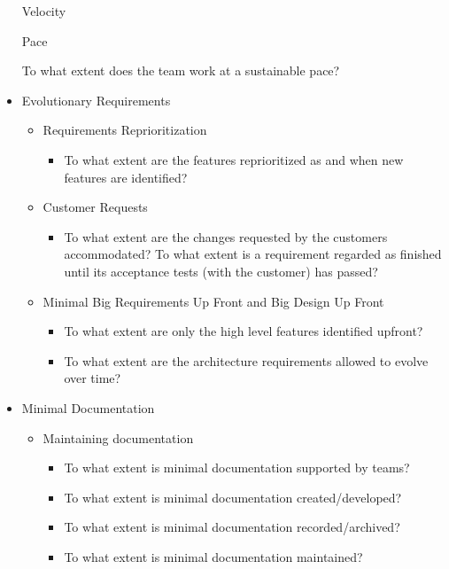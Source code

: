 \begin{appendices}
\begin{itemize}
	\addition Velocity
		\begin{itemize}
			\addition Pace
				\begin{itemize}
					\addition To what extent does the team work at a sustainable pace?
				\end{itemize}
		\end{itemize}
	\item Evolutionary Requirements
		\begin{itemize}
			\item Requirements Reprioritization 
				\begin{itemize}
					\item To what extent are the features reprioritized as and when new features are identified?
				\end{itemize}
			\item Customer Requests
				\begin{itemize}
					\item To what extent are the changes requested by the customers accommodated?
					\addition To what extent is a requirement regarded as finished until its acceptance tests (with the customer) has passed?
				\end{itemize}
			\item Minimal Big Requirements Up Front and Big Design Up Front
				\begin{itemize}
					\item To what extent are only the high level features identified upfront?
					\item To what extent are the architecture requirements allowed to evolve over time?
				\end{itemize}
		\end{itemize}
	\item Minimal Documentation
		\begin{itemize}
			\item Maintaining documentation 
				\begin{itemize}
					\item To what extent is minimal documentation supported by teams?
					\item To what extent is minimal documentation created/developed?
					\item To what extent is minimal documentation recorded/archived?
					\item To what extent is minimal documentation maintained?
				\end{itemize}
		\end{itemize}
\end{itemize}

\end{appendices}

